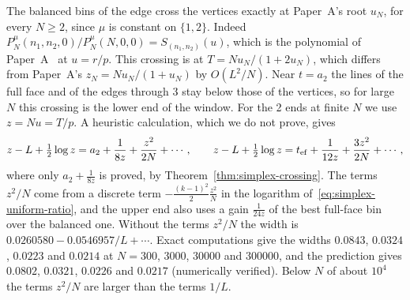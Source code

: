 \begin{remark}\label{rem:K3-finite}
The balanced bins of the edge cross the vertices exactly at Paper~A's root
$u_N$, for every $N\ge2$, since $\mu$ is constant on $\{1,2\}$. Indeed
$P^\mu_N(n_1,n_2,0)/P^\mu_N(N,0,0)=S_{(n_1,n_2)}(u)$, which is the polynomial of
Paper~A~\cite{paperA} at $u=r/p$. This crossing is at $T=Nu_N/(1+2u_N)$, which
differs from Paper~A's $z_N=Nu_N/(1+u_N)$ by $O(L^2/N)$. Near $t=a_2$ the lines
of the full face and of the edges through 3 stay below those of the vertices, so
for large $N$ this crossing is the lower end of the window. For the 2 ends at
finite $N$ we use $z=Nu=T/p$. A heuristic calculation, which we do not prove, gives
\[
 z-L+\tfrac12\log z=a_2+\frac1{8z}+\frac{z^2}{2N}+\cdots,\qquad
 z-L+\tfrac12\log z=t_{\rm ef}+\frac1{12z}+\frac{3z^2}{2N}+\cdots,
\]
where only $a_2+\frac1{8z}$ is proved, by Theorem~\ref{thm:simplex-crossing}.
The terms $z^2/N$ come from a discrete term $-\frac{(k-1)^2}2\frac{z^2}N$ in the
logarithm of~\eqref{eq:simplex-uniform-ratio}, and the upper end also uses a gain
$\frac1{24z}$ of the best full-face bin over the balanced one. Without the terms
$z^2/N$ the width is $0.0260580-0.0546957/L+\cdots$. Exact computations give
the widths $0.0843$, $0.0324$, $0.0223$ and $0.0214$ at $N=300$, $3000$,
$30000$ and $300000$, and the prediction gives $0.0802$, $0.0321$, $0.0226$ and
$0.0217$ (numerically verified). Below $N$ of about $10^4$ the terms $z^2/N$ are
larger than the terms $1/L$.
\end{remark}
